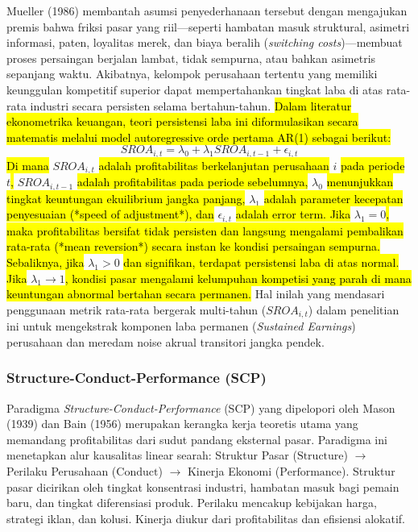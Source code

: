 \documentclass[12pt,a4paper]{article}
\begin{document}
Mueller (1986) membantah asumsi penyederhanaan tersebut dengan
mengajukan premis bahwa friksi pasar yang riil---seperti hambatan masuk
struktural, asimetri informasi, paten, loyalitas merek, dan biaya
beralih (\emph{switching costs})---membuat proses persaingan berjalan
lambat, tidak sempurna, atau bahkan asimetris sepanjang waktu.
Akibatnya, kelompok perusahaan tertentu yang memiliki keunggulan
kompetitif superior dapat mempertahankan tingkat laba di atas rata-rata
industri secara persisten selama bertahun-tahun.
\hl{Dalam literatur ekonometrika keuangan, teori persistensi laba ini diformulasikan secara matematis melalui model autoregressive orde pertama AR(1) sebagai berikut:
}$$SROA_{i,t} = \lambda_0 + \lambda_1 SROA_{i,t-1} + \epsilon_{i,t}$$\hl{
Di mana }$SROA_{i,t}$\hl{ adalah profitabilitas berkelanjutan perusahaan }$i$\hl{ pada periode }$t$\hl{, }$SROA_{i,t-1}$\hl{ adalah profitabilitas pada periode sebelumnya, }$\lambda_0$\hl{ menunjukkan tingkat keuntungan ekuilibrium jangka panjang, }$\lambda_1$\hl{ adalah parameter kecepatan penyesuaian (*speed of adjustment*), dan }$\epsilon_{i,t}$\hl{ adalah error term. Jika }$\lambda_1 = 0$\hl{, maka profitabilitas bersifat tidak persisten dan langsung mengalami pembalikan rata-rata (*mean reversion*) secara instan ke kondisi persaingan sempurna. Sebaliknya, jika }$\lambda_1 > 0$\hl{ dan signifikan, terdapat persistensi laba di atas normal. Jika }$\lambda_1 \rightarrow 1$\hl{, kondisi pasar mengalami kelumpuhan kompetisi yang parah di mana keuntungan abnormal bertahan secara permanen.}
Hal inilah yang mendasari penggunaan metrik rata-rata bergerak
multi-tahun (\(SROA_{i,t}\)) dalam penelitian ini untuk mengekstrak
komponen laba permanen (\emph{Sustained Earnings}) perusahaan dan
meredam noise akrual transitori jangka pendek.

\subsubsection{Structure-Conduct-Performance
(SCP)}\label{structure-conduct-performance-scp}

Paradigma \emph{Structure-Conduct-Performance} (SCP) yang dipelopori
oleh Mason (1939) dan Bain (1956) merupakan kerangka kerja teoretis
utama yang memandang profitabilitas dari sudut pandang eksternal pasar.
Paradigma ini menetapkan alur kausalitas linear searah: Struktur Pasar
(\(\text{Structure}\)) \(\rightarrow\) Perilaku Perusahaan
(\(\text{Conduct}\)) \(\rightarrow\) Kinerja Ekonomi
(\(\text{Performance}\)). Struktur pasar dicirikan oleh tingkat
konsentrasi industri, hambatan masuk bagi pemain baru, dan tingkat
diferensiasi produk. Perilaku mencakup kebijakan harga, strategi iklan,
dan kolusi. Kinerja diukur dari profitabilitas dan efisiensi alokatif.
\end{document}
